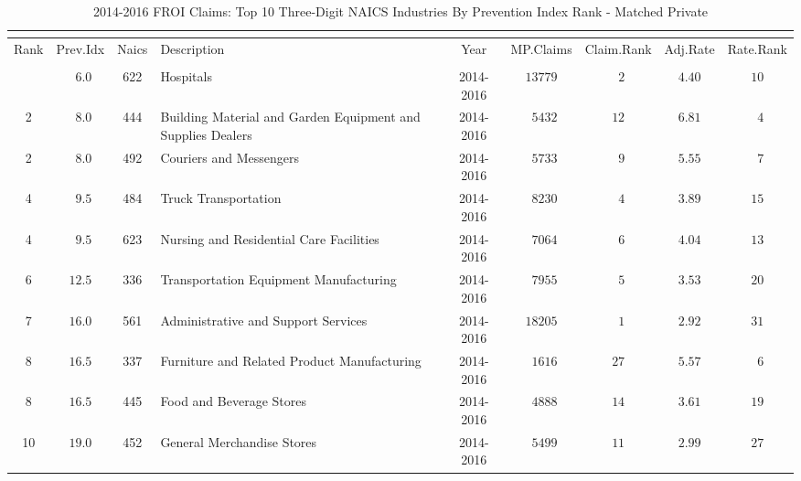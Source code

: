 \documentclass[9pt, oneside]{article}   	%
\begin{document}
\begin{longtable}{cccp{2.5in}ccccc}
\caption{2014-2016 FROI Claims: Top 10 Three-Digit NAICS Industries By Prevention Index Rank - Matched Private}\\ 
\label{Table: 10bb}\\
\hline 
\toprule
  Rank & Prev.Idx & Naics & Description & Year & MP.Claims & Claim.Rank & Adj.Rate & \multicolumn{1}{c}{Rate.Rank} \\ 
  \midrule\\ [-1\normalbaselineskip]\hline\endhead\hline\endfoot
\hline
1  & $\phantom{0}6.0$ & 622 & Hospitals & 2014-2016 & $13779$ & $\phantom{0}2$ & $4.40$ & $10$ \\
2  & $\phantom{0}8.0$ & 444 & Building Material and Garden Equipment and Supplies Dealers & 2014-2016 & $\phantom{0}5432$ & $12$ & $6.81$ & $\phantom{0}4$ \\
2  & $\phantom{0}8.0$ & 492 & Couriers and Messengers & 2014-2016 & $\phantom{0}5733$ & $\phantom{0}9$ & $5.55$ & $\phantom{0}7$ \\
4  & $\phantom{0}9.5$ & 484 & Truck Transportation & 2014-2016 & $\phantom{0}8230$ & $\phantom{0}4$ & $3.89$ & $15$ \\
4  & $\phantom{0}9.5$ & 623 & Nursing and Residential Care Facilities & 2014-2016 & $\phantom{0}7064$ & $\phantom{0}6$ & $4.04$ & $13$ \\
6  & $12.5$ & 336 & Transportation Equipment Manufacturing & 2014-2016 & $\phantom{0}7955$ & $\phantom{0}5$ & $3.53$ & $20$ \\
7  & $16.0$ & 561 & Administrative and Support Services & 2014-2016 & $18205$ & $\phantom{0}1$ & $2.92$ & $31$ \\
8  & $16.5$ & 337 & Furniture and Related Product Manufacturing & 2014-2016 & $\phantom{0}1616$ & $27$ & $5.57$ & $\phantom{0}6$ \\
8  & $16.5$ & 445 & Food and Beverage Stores & 2014-2016 & $\phantom{0}4888$ & $14$ & $3.61$ & $19$ \\
10  & $19.0$ & 452 & General Merchandise Stores & 2014-2016 & $\phantom{0}5499$ & $11$ & $2.99$ & $27$ \\
\cline{1-1} \cline{2-2} \cline{3-3} \cline{4-4} \cline{5-5} \cline{6-6} \cline{7-7} \cline{8-8} \cline{9-9} %

\hline 
\end{longtable}
\end{document}
